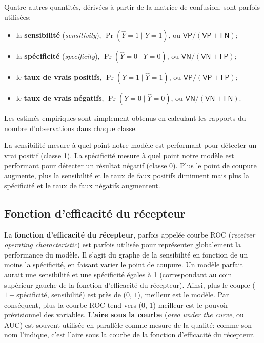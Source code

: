 \documentclass[
  11pt,
  letterpaper,
]{book}
\providecommand{\tightlist}{%
  \setlength{\itemsep}{0pt}\setlength{\parskip}{0pt}}\usepackage{longtable,booktabs,array}
\theoremstyle{definition}
\theoremstyle{remark}
\begin{document}
Quatre autres quantités, dérivées à partir de la matrice de confusion,
sont parfois utilisées:

\begin{itemize}
\tightlist
\item
  la \textbf{sensibilité} (\emph{sensitivity}),
  \(\Pr(\widehat{Y}=1 \mid Y=1)\), ou
  \(\mathsf{VP}/(\mathsf{VP}+\mathsf{FN})\);
\item
  la \textbf{spécificité} (\emph{specificity}),
  \(\Pr(\widehat{Y}=0 \mid Y=0)\), ou
  \(\mathsf{VN}/(\mathsf{VN}+\mathsf{FP})\);
\item
  le \textbf{taux de vrais positifs}, \(\Pr(Y=1 \mid \widehat{Y}=1)\),
  ou \(\mathsf{VP}/(\mathsf{VP}+\mathsf{FP})\);
\item
  le \textbf{taux de vrais négatifs}, \(\Pr(Y=0 \mid \widehat{Y}=0)\),
  ou \(\mathsf{VN}/(\mathsf{VN}+\mathsf{FN})\).
\end{itemize}

Les estimés empiriques sont simplement obtenus en calculant les rapports
du nombre d'observations dans chaque classe.

La sensibilité mesure à quel point notre modèle est performant pour
détecter un vrai positif (classe 1). La spécificité mesure à quel point
notre modèle est performant pour détecter un résultat négatif (classe
0). Plus le point de coupure augmente, plus la sensibilité et le taux de
faux positifs diminuent mais plus la spécificité et le taux de faux
négatifs augmentent.

\hypertarget{fonction-defficacituxe9-du-ruxe9cepteur}{%
\subsection{Fonction d'efficacité du
récepteur}\label{fonction-defficacituxe9-du-ruxe9cepteur}}

La \textbf{fonction d'efficacité du récepteur}, parfois appelée courbe
ROC (\emph{receiver operating characteristic}) est parfois utilisée pour
représenter globalement la performance du modèle. Il s'agit du graphe de
la sensibilité en fonction de un moins la spécificité, en faisant varier
le point de coupure. Un modèle parfait aurait une sensibilité et une
spécificité égales à 1 (correspondant au coin supérieur gauche de la
fonction d'efficacité du récepteur). Ainsi, plus le couple
(\(1-\)spécificité, sensibilité) est près de (\(0\), \(1\)), meilleur
est le modèle. Par conséquent, plus la courbe ROC tend vers (\(0\),
\(1\)) meilleur est le pouvoir prévisionnel des variables.
L'\textbf{aire sous la courbe} (\emph{area under the curve}, ou AUC) est
souvent utilisée en parallèle comme mesure de la qualité: comme son nom
l'indique, c'est l'aire sous la courbe de la fonction d'efficacité du
récepteur.
\end{document}
